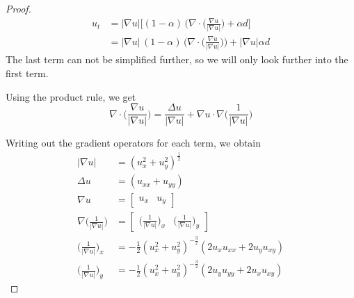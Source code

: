 \begin{proof}
\begin{equation}\label{eq:proof-writeout}
    \begin{aligned}
        u_t &= |\nabla u| \bigg[(1-\alpha)\,(\nabla \cdot \bigg(\frac{\nabla u}{|\nabla u|}\bigg) + \alpha d \bigg] \\ &= |\nabla u|\,(1-\alpha)\,\bigg( \nabla \cdot \bigg(\frac{\nabla u}{|\nabla u|}\bigg) \bigg) + |\nabla u| \alpha d
    \end{aligned}
\end{equation}
The last term can not be simplified further, so we will only look further into the first term.

Using the product rule, we get
\begin{equation*}
    \nabla \cdot \bigg(\frac{\nabla u}{|\nabla u|}\bigg) = \frac{\Delta u}{|\nabla u|} + \nabla u \cdot \nabla\bigg( \frac{1}{|\nabla u|}\bigg)
\end{equation*}

Writing out the gradient operators for each term, we obtain
\begin{align}
    |\nabla u| &= (u_x^2+u_y^2)^{\frac{1}{2}} \label{eqs:grads-1}\\
    \Delta u &= (u_{xx} + u_{yy}) \label{eqs:grads-2}\\
    \nabla u &= \begin{bmatrix}u_x & u_y \end{bmatrix} \label{eqs:grads-3}\\
    \nabla \bigg( \frac{1}{|\nabla u|} \bigg) &= \begin{bmatrix}\bigg( \frac{1}{|\nabla u|} \bigg)_x & \bigg( \frac{1}{|\nabla u|} \bigg)_y \end{bmatrix} \label{eqs:grads-4}\\
    \bigg( \frac{1}{|\nabla u|} \bigg)_x &= -\frac{1}{2} (u_x^2+u_y^2)^{-\frac{3}{2}}(2u_x u_{xx}+2u_y u_{xy}) \label{eqs:grads-5}\\
    \bigg( \frac{1}{|\nabla u|} \bigg)_y &= -\frac{1}{2} (u_x^2+u_y^2)^{-\frac{3}{2}}(2u_y u_{yy}+2u_x u_{xy}) \label{eqs:grads-6}
\end{align}


\end{proof}
